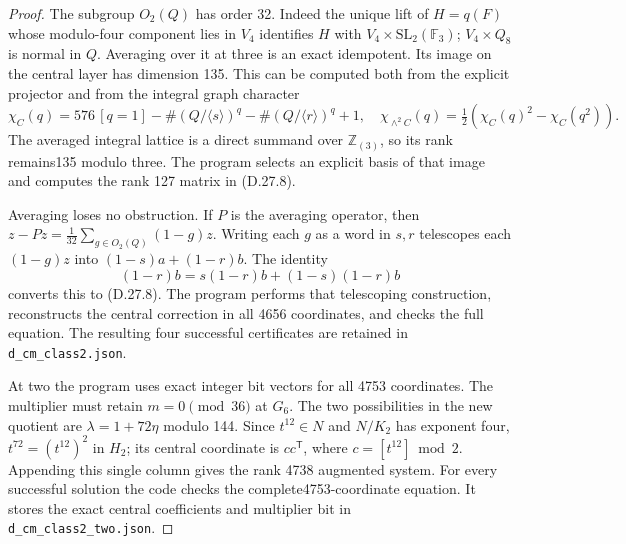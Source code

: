 \begin{proof}
The subgroup $O_2(Q)$ has order 32. Indeed the unique lift
of $H=q(F)$ whose modulo-four component lies in $V_4$
identifies $H$ with $V_4\times\mathrm{SL}_2(\mathbb F_3)$;
$V_4\times Q_8$ is normal in $Q$. Averaging over it at
three is an exact idempotent. Its image on the central
layer has dimension 135. This can be computed both from
the explicit projector and from the integral graph
character
\[
 \chi_C(q)=576\,[q=1]-\#(Q/\langle s\rangle)^q
                -\#(Q/\langle r\rangle)^q+1,
 \quad
 \chi_{\wedge^2C}(q)=\tfrac12(\chi_C(q)^2-\chi_C(q^2)).
\]
The averaged integral lattice is a direct summand over
$\mathbb Z_{(3)}$, so its rank remains135 modulo three.
The program selects an explicit basis of that image and
computes the rank 127 matrix in (D.27.8).

Averaging loses no obstruction. If $P$ is the averaging
operator, then $z-Pz=\frac1{32}\sum_{g\in O_2(Q)}(1-g)z$.
Writing each $g$ as a word in $s,r$ telescopes each
$(1-g)z$ into $(1-s)a+(1-r)b$. The identity
\[
 (1-r)b=s(1-r)b+(1-s)(1-r)b
\]
converts this to (D.27.8). The program performs that
telescoping construction, reconstructs the central
correction in all 4656 coordinates, and checks the full
equation. The resulting four successful certificates
are retained in \texttt{d\_cm\_class2.json}.

At two the program uses exact integer bit vectors for all
4753 coordinates. The multiplier must retain
$m=0\pmod{36}$ at $G_6$. The two possibilities in the new
quotient are $\lambda=1+72\eta$ modulo 144. Since $t^{12}\in N$
and $N/K_2$ has exponent four,
$t^{72}=(t^{12})^2$ in $H_2$; its central coordinate is
$c c^{\mathsf T}$, where $c=[t^{12}]\bmod2$.
Appending this single column gives the rank 4738 augmented
system. For every successful solution the code checks the
complete4753-coordinate equation. It stores the exact
central coefficients and multiplier bit in
\texttt{d\_cm\_class2\_two.json}.


\end{proof}
